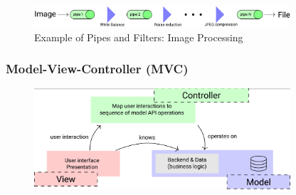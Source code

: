 \documentclass[
../../Software_Engineering_Summary.tex,
]
{subfiles}
\begin{document}
\begin{figure}
    [htp]
    \centering
    \includegraphics[width = 0.85\textwidth]{Pics/05/PipesAndFiltersExample.png}
    \caption{Example of Pipes and Filters: Image Processing}
\end{figure}

\subsubsection{Model-View-Controller (MVC)}
\begin{figure}
    [htp]
    \centering
    \includegraphics[width = 0.85\textwidth]{Pics/05/ModelViewController.png}
\end{figure}
\end{document}
